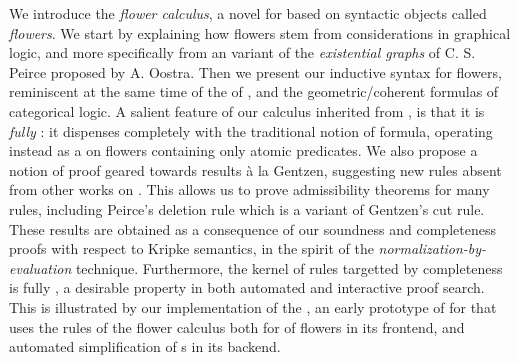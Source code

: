 \begin{scope}


We introduce the \emph{flower calculus}, a novel  for
  based on syntactic objects called
\emph{flowers}. We start by explaining how flowers stem from considerations in
graphical logic, and more specifically from an  variant of
the \emph{existential graphs} of C. S. Peirce proposed by A. Oostra. Then we
present our inductive syntax for flowers, reminiscent at the same time of the
 of  , and the geometric/coherent
formulas of categorical logic. A salient feature of our calculus inherited from
, is that it is \emph{fully }: it dispenses completely with
the traditional notion of  formula, operating instead as a
 on flowers containing only atomic predicates. We also propose a
notion of proof geared towards  results à la Gentzen, suggesting new
rules absent from other works on  . This allows us to
prove admissibility theorems for many rules, including Peirce's deletion rule
which is a variant of Gentzen's cut rule. These results are obtained as a
consequence of our soundness and completeness proofs with respect to Kripke
semantics, in the spirit of the \emph{normalization-by-evaluation} technique.
Furthermore, the kernel of rules targetted by completeness is fully ,
a desirable property in both automated and interactive proof search. This is
illustrated by our implementation of the , an early prototype of
 for  that uses the rules of the flower calculus both for  of flowers in its frontend, and automated simplification of s
in its backend.


\end{scope}
